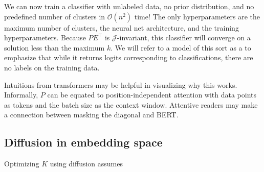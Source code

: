 




We can now train a classifier with unlabeled data, no prior distribution, and no predefined number of clusters in $\mathcal{O}(n^2)$ time!
The only hyperparameters are the maximum number of clusters, the neural net architecture, and the training hyperparameters.
Because $PE^\top$ is $\mathcal{J}$-invariant, this classifier will converge on a solution less than the maximum $k$.
We will refer to a model of this sort as a \Partitioner to emphasize that while it returns logits corresponding to classifications, there are no labels on the training data.

Intuitions from transformers may be helpful in visualizing why this works.
Informally, $P$ can be equated to position-independent attention with data points as tokens and the batch size as the context window.
Attentive readers may make a connection between masking the diagonal and BERT.

\subsection{Diffusion in embedding space}

Optimizing $K$ using diffusion assumes 
